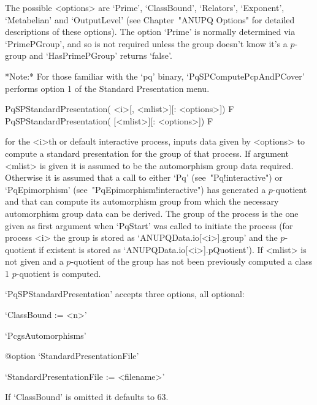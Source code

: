 The possible <options> are `Prime', `ClassBound', `Relators', `Exponent',
`Metabelian' and `OutputLevel' (see Chapter~"ANUPQ Options" for  detailed
descriptions of these options). The option `Prime' is normally determined
via `PrimePGroup', and so is not required unless the group  doesn't  know
it's a $p$-group and `HasPrimePGroup' returns `false'.

*Note:*
For  those  familiar  with  the  `pq'  binary,  `PqSPComputePcpAndPCover'
performs option 1 of the Standard Presentation menu.

\>PqSPStandardPresentation( <i>[, <mlist>][: <options>]) F
\>PqSPStandardPresentation( [<mlist>][: <options>]) F

for the <i>th or default interactive {\ANUPQ} process, inputs data  given
by <options> to compute a standard presentation for  the  group  of  that
process.  If  argument  <mlist>  is  given  it  is  assumed  to  be   the
automorphism group data required. Otherwise it is assumed that a call  to
either      `Pq'      (see~"Pq!interactive")      or      `PqEpimorphism'
(see~"PqEpimorphism!interactive") has generated a $p$-quotient  and  that
{\GAP} can compute  its  automorphism  group  from  which  the  necessary
automorphism group data can be derived. The group of the process  is  the
one given as first argument when `PqStart' was  called  to  initiate  the
process (for process <i> the group is stored as `ANUPQData.io[<i>].group'
and     the     $p$-quotient     if     existent     is     stored     as
`ANUPQData.io[<i>].pQuotient').  If  <mlist>   is   not   given   and   a
$p$-quotient of the group has not been  previously  computed  a  class  1
$p$-quotient is computed.

`PqSPStandardPresentation' accepts three options, all optional:

\beginlist%

\item{}`ClassBound := <n>'

\item{}`PcgsAutomorphisms'

%
{@option \noexpand`StandardPresentationFile'}
\item{}`StandardPresentationFile := <filename>'

\endlist

If `ClassBound' is omitted it defaults to 63.

